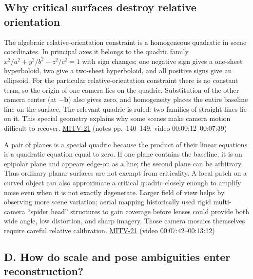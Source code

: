 \subsection{Why critical surfaces destroy relative orientation}\label{04-visual-computing-ii-ch032-why-critical-surfaces-destroy-relative-orientation}

\hypertarget{04-visual-computing-ii-ch032-why-critical-surfaces-destroy-relative-orientation}{}

The algebraic relative-orientation constraint is a homogeneous quadratic in scene coordinates. In principal axes it belongs to the quadric family \(x^2/a^2+y^2/b^2+z^2/c^2=1\) with sign changes; one negative sign gives a one-sheet hyperboloid, two give a two-sheet hyperboloid, and all positive signs give an ellipsoid. For the particular relative-orientation constraint there is no constant term, so the origin of one camera lies on the quadric. Substitution of the other camera center (at \(-\mathbf{b}\)) also gives zero, and homogeneity places the entire baseline line on the surface. The relevant quadric is ruled: two families of straight lines lie on it. This special geometry explains why some scenes make camera motion difficult to recover. \hyperref[04-visual-computing-ii-ch036-mitv-21---relative-orientation-binocular-stereo-structure-quadrics-calibration-reprojection]{MITV-21} (notes pp.~140--149; video 00:00:12--00:07:39)

A pair of planes is a special quadric because the product of their linear equations is a quadratic equation equal to zero. If one plane contains the baseline, it is an epipolar plane and appears edge-on as a line; the second plane can be arbitrary. Thus ordinary planar surfaces are not exempt from criticality. A local patch on a curved object can also approximate a critical quadric closely enough to amplify noise even when it is not exactly degenerate. Larger field of view helps by observing more scene variation; aerial mapping historically used rigid multi-camera ``spider head'' structures to gain coverage before lenses could provide both wide angle, low distortion, and sharp imagery. Those camera mosaics themselves require careful relative calibration. \hyperref[04-visual-computing-ii-ch036-mitv-21---relative-orientation-binocular-stereo-structure-quadrics-calibration-reprojection]{MITV-21} (video 00:07:42--00:13:12)

\subsection{D. How do scale and pose ambiguities enter reconstruction?}\label{04-visual-computing-ii-ch032-d.-how-do-scale-and-pose-ambiguities-enter-reconstruction}

